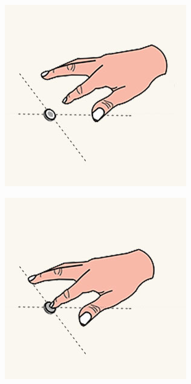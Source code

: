 \begin{enumerate}
\begin{figure}[!ht]
\begin{subfigure}{0.25\textwidth}
        \end{subfigure}%
        \begin{subfigure}{0.25\textwidth}
            \centering
            \includegraphics[width=0.9\linewidth]{images/hololens_interaction_press_step2.jpg}
        \end{subfigure}%
        \begin{subfigure}{0.25\textwidth}
            \centering
            \includegraphics[width=0.9\linewidth]{images/hololens_interaction_press_step3.jpg}

\end{subfigure}
\end{figure}
\end{enumerate}
